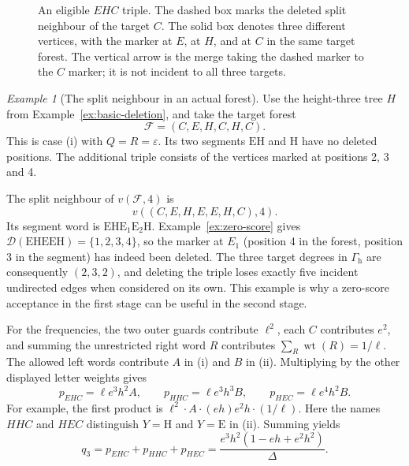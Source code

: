 \documentclass[11pt,a4paper]{article}
\theoremstyle{definition}
\theoremstyle{remark}
\newtheorem{example}{Example}[section]
\newcommand{\wt}{\operatorname{wt}}
\newcommand{\E}{\mathrm E}
\newcommand{\HH}{\mathrm H}
\newcommand{\LL}{\mathrm L}
\newcommand{\CC}{\mathrm C}
\newcommand{\Gh}{\Gamma_{\mathrm h}}
\begin{document}
\begin{figure}[htbp]
\centering
{}
\caption{An eligible $EHC$ triple. The dashed box marks the deleted split neighbour of the target $C$. The solid box denotes three different vertices, with the marker at $E$, at $H$, and at $C$ in the same target forest. The vertical arrow is the merge taking the dashed marker to the $C$ marker; it is not incident to all three targets.}\label{fig:triple}
\end{figure}

\begin{example}[The split neighbour in an actual forest]\label{ex:triple}
Use the height-three tree $H$ from Example~\ref{ex:basic-deletion}, and take the target forest
\[
\mathcal F=(C,E,H,C,H,C).
\]
This is case (i) with $Q=R=\varepsilon$. Its two segments $\E\HH$ and $\HH$ have no deleted positions. The additional triple consists of the vertices marked at positions 2, 3 and 4.

The split neighbour of $v(\mathcal F,4)$ is
\[
v((C,E,H,E,E,H,C),4).
\]
Its segment word is $\E\HH\E_1\E_2\HH$. Example~\ref{ex:zero-score} gives $\mathcal D(\E\HH\E\E\HH)=\{1,2,3,4\}$, so the marker at $E_1$ (position 4 in the forest, position 3 in the segment) has indeed been deleted. The three target degrees in $\Gh$ are consequently $(2,3,2)$, and deleting the triple loses exactly five incident undirected edges when considered on its own. This example is why a zero-score acceptance in the first stage can be useful in the second stage.
\end{example}

For the frequencies, the two outer guards contribute $\ell^2$, each $C$ contributes $e^2$, and summing the unrestricted right word $R$ contributes
$\sum_R\wt(R)=1/\ell$. The allowed left words contribute $A$ in (i) and $B$ in (ii). Multiplying by the other displayed letter weights gives
\begin{equation}\label{eq:triplefreqs}
p_{EHC}=\ell e^3h^2A,\qquad
p_{HHC}=\ell e^3h^3B,\qquad
p_{HEC}=\ell e^4h^2B.
\end{equation}
For example, the first product is $\ell^2\cdot A\cdot(eh)e^2h\cdot(1/\ell)$. Here the names $HHC$ and $HEC$ distinguish $Y=\HH$ and $Y=\E$ in (ii). Summing yields
\begin{equation}\label{eq:q3closed}
q_3=p_{EHC}+p_{HHC}+p_{HEC}
=\frac{e^3h^2(1-eh+e^2h^2)}{\Delta}.
\end{equation}
\end{document}
